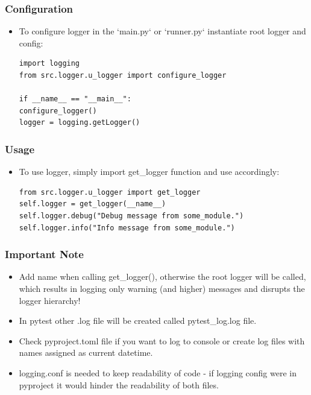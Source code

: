 \documentclass[english,10pt,a4paper]{article}
\begin{document}
	\subsubsection{Configuration}

	\begin{itemize}
		\item To configure logger in the `main.py` or `runner.py` instantiate root logger and config:
		\begin{lstlisting}
import logging
from src.logger.u_logger import configure_logger

if __name__ == "__main__":
configure_logger()
logger = logging.getLogger()
		\end{lstlisting}
	\end{itemize}

	\subsubsection{Usage}

	\begin{itemize}
		\item To use logger, simply import \colorbox{gray!20}{get\_logger} function and use accordingly:
		\begin{lstlisting}
from src.logger.u_logger import get_logger
self.logger = get_logger(__name__)
self.logger.debug("Debug message from some_module.")
self.logger.info("Info message from some_module.")
		\end{lstlisting}
	\end{itemize}

	\subsubsection{Important Note}

	\begin{itemize}
		\item Add name when calling \colorbox{gray!20}{get\_logger()}, otherwise the root logger will be called, which results in logging only warning (and higher) messages and disrupts the logger hierarchy!
		\item In pytest other .log file will be created called \colorbox{gray!20}{pytest\_log.log} file.
		\item Check \colorbox{gray!20}{pyproject.toml} file if you want to log to console or create log files with names assigned as current datetime.
		\item \colorbox{gray!20}{logging.conf} is needed to keep readability of code - if logging config were in pyproject it would hinder the readability of both files.
	\end{itemize}
\end{document}
